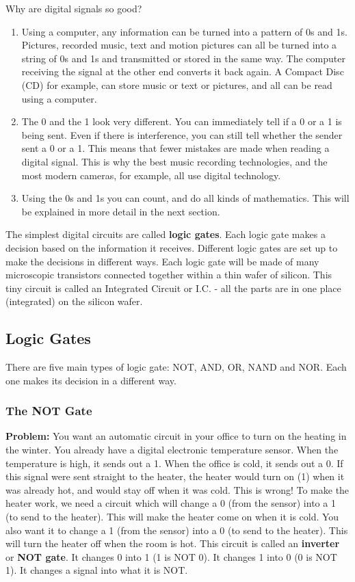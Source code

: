 Why are digital signals so good?
\begin{enumerate}
\item Using a computer, any information can be turned into a pattern of 0s and 1s.  Pictures, recorded music, text and motion pictures can all be turned into a string of 0s and 1s and transmitted or stored in the same way.  The computer receiving the signal at the other end converts it back again.  A Compact Disc (CD) for example, can store music or text or pictures, and all can be read using a computer.
\item The 0 and the 1 look very different.  You can immediately tell if a 0 or a 1 is being sent.  Even if there is interference, you can still tell whether the sender sent a 0 or a 1.  This means that fewer mistakes are made when reading a digital signal.  This is why the best music recording technologies, and the most modern cameras, for example, all use digital technology.
\item Using the 0s and 1s you can count, and do all kinds of mathematics.  This will be explained in more detail in the next section.
\end{enumerate}

The simplest digital circuits are called {\bf logic gates}.  Each logic gate makes a decision based on the information it receives.  Different logic gates are set up to make the decisions in different ways.  Each logic gate will be made of many microscopic transistors connected together within a thin wafer of silicon.  This tiny circuit is called an Integrated Circuit or I.C. - all the parts are in one place (integrated) on the silicon wafer.  

\subsection{Logic Gates}
There are five main types of logic gate: NOT, AND, OR, NAND and NOR. Each one makes its decision in a different way.


\subsubsection{The NOT Gate}
{\bf Problem:} You want an automatic circuit in your office to turn on the heating in the winter.  You already have a digital electronic temperature sensor.  When the temperature is high, it sends out a 1.  When the office is cold, it sends out a 0.  If this signal were sent straight to the heater, the heater would turn on (1) when it was already hot, and would stay off when it was cold.  This is wrong!  To make the heater work, we need a circuit which will change a 0 (from the sensor) into a 1 (to send to the heater).  This will make the heater come on when it is cold. You also want it to change a 1 (from the sensor) into a 0 (to send to the heater).  This will turn the heater off when the room is hot.  This circuit is called an {\bf inverter} or {\bf NOT gate}.  It changes 0 into 1 (1 is NOT 0).  It changes 1 into 0 (0 is NOT 1).  It changes a signal into what it is NOT.

